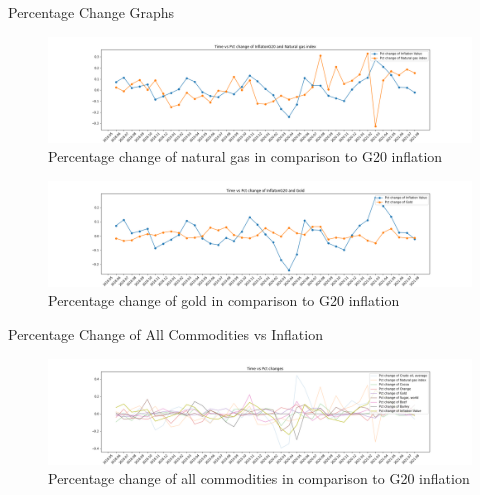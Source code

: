 \begin{frame}{Percentage Change Graphs}
 \begin{figure} [H]
	\begin{center}
		\includegraphics[scale=0.2]{images/illustrate/pct_change_inflation_and_Natural gas index.png}
	\end{center}
	\caption{Percentage change of natural gas in comparison to G20 inflation  }
	\label{fig:log-archi}
\end{figure}

\begin{figure} [H]
	\begin{center}
		\includegraphics[scale=0.2]{images/illustrate/pct_change_inflation_and_Gold.png}
	\end{center}
	\caption{Percentage change of gold in comparison to G20 inflation  }
	\label{fig:log-archi}
\end{figure}

\end{frame}

\begin{frame}{Percentage Change of All Commodities vs Inflation}
    \begin{figure} [H]
	\begin{center}
		\includegraphics[scale=0.2]{images/illustrate/pct_changes_together.png}
	\end{center}
	\caption{Percentage change of all commodities in comparison to G20 inflation  }
	\label{fig:log-archi}
\end{figure}
\end{frame}


